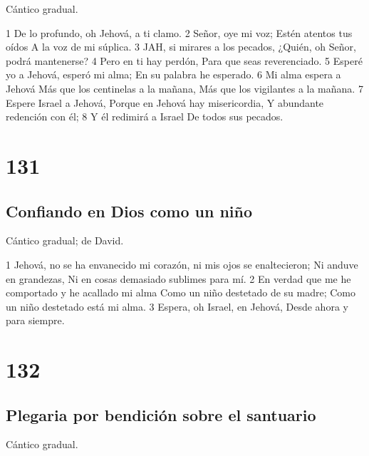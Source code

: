 Cántico gradual.

1 De lo profundo, oh Jehová, a ti clamo.
2 Señor, oye mi voz;
Estén atentos tus oídos
A la voz de mi súplica.
3 JAH, si mirares a los pecados,
¿Quién, oh Señor, podrá mantenerse?
4 Pero en ti hay perdón,
Para que seas reverenciado.
5 Esperé yo a Jehová, esperó mi alma;
En su palabra he esperado.
6 Mi alma espera a Jehová
Más que los centinelas a la mañana,
Más que los vigilantes a la mañana.
7 Espere Israel a Jehová,
Porque en Jehová hay misericordia,
Y abundante redención con él;
8 Y él redimirá a Israel
De todos sus pecados.

\chapter{131}

\section*{Confiando en Dios como un niño}

Cántico gradual; de David.

1 Jehová, no se ha envanecido mi corazón, ni mis ojos se enaltecieron;
Ni anduve en grandezas,
Ni en cosas demasiado sublimes para mí.
2 En verdad que me he comportado y he acallado mi alma
Como un niño destetado de su madre;
Como un niño destetado está mi alma.
3 Espera, oh Israel, en Jehová,
Desde ahora y para siempre.

\chapter{132}

\section*{Plegaria por bendición sobre el santuario}

Cántico gradual.

